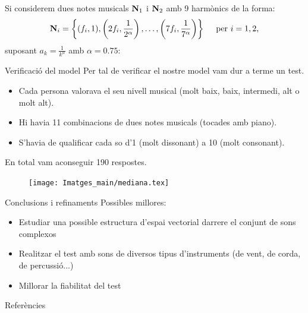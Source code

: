 \documentclass[10pt,hyperref={colorlinks,linkcolor=black,citecolor=blue!80,urlcolor=blue!60},handout]{beamer} %
\theoremstyle{definition}
\newcommand{\0}{\ensuremath{\vb{0}}}
\newcommand{\N}{\ensuremath{\vb{N}}}
\begin{document}
\begin{frame}
    Si considerem dues notes musicals $\N_1$ i $\N_2$ amb 9 harmònics de la forma: $$\N_i=\left\{(f_i,1),\left(2f_i,\frac{1}{2^\alpha}\right),\ldots,\left(7f_i,\frac{1}{7^\alpha}\right)\right\}\quad\text{ per }i=1,2,$$ suposant $a_k=\frac{1}{k^\alpha}$ amb $\alpha=0.75$:\pause
    \begin{figure}
        \centering
        
    \end{figure}
\end{frame}
\begin{frame}{Verificació del model}
    Per tal de verificar el nostre model vam dur a terme un test. \pause
    \begin{itemize}
        \item Cada persona valorava el seu nivell musical (molt baix, baix, intermedi, alt o molt alt).\pause
        \item Hi havia 11 combinacions de dues notes musicals (tocades amb piano).\pause
        \item S'havia de qualificar cada so d'1 (molt dissonant) a 10 (molt consonant).
    \end{itemize}\pause
    En total vam aconseguir 190 respostes.
    \begin{figure}
        \centering
        \texttt{[image: Imatges\_main/mediana.tex]}
    \end{figure}
\end{frame}
\begin{frame}{Conclusions i refinaments}
    Possibles millores:\pause
    \begin{itemize}
        \item Estudiar una possible estructura d'espai vectorial darrere el conjunt de sons complexos\pause
        \item Realitzar el test amb sons de diversos tipus d'instruments (de vent, de corda, de percussió...)\pause
        \item Millorar la fiabilitat del test
    \end{itemize}
\end{frame}
\begin{frame}[noframenumbering]{Referències}
    \printbibliography[heading=none]
\end{frame}
\end{document}
